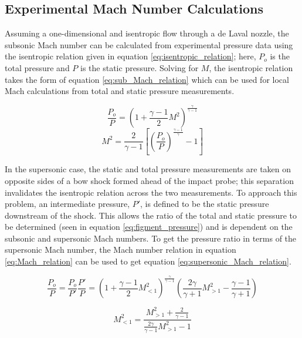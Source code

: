 \documentclass[runningheads]{llncs}
\begin{document}
\subsection{Experimental Mach Number Calculations}

Assuming a one-dimensional and isentropic flow through a de Laval nozzle, the subsonic Mach number can be calculated from experimental pressure data using the isentropic relation given in equation \ref{eq:isentropic_relation}; here, $P_o$ is the total pressure and $P$ is the static pressure. Solving for $M$, the isentropic relation takes the form of equation \ref{eq:sub_Mach_relation} which can be used for local Mach calculations from total and static pressure measurements.

\begin{multicols}{2}
\begin{equation}
    \frac{P_o}{P} = \left(1 + \frac{\gamma - 1}{2}M^2\right)^\frac{\gamma}{\gamma - 1}
    \label{eq:isentropic_relation}
\end{equation}
\begin{equation}
    M^2 = \frac{2}{\gamma - 1}\left[\left(\frac{P_o}{P}\right)^\frac{\gamma - 1}{\gamma} - 1\right]
    \label{eq:sub_Mach_relation}
\end{equation}
\end{multicols}

\noindent
In the supersonic case, the static and total pressure measurements are taken on opposite sides of a bow shock formed ahead of the impact probe; this separation invalidates the isentropic relation across the two measurements. To approach this problem, an intermediate pressure, $P'$, is defined to be the static pressure downstream of the shock. This allows the ratio of the total and static pressure to be determined (seen in equation \ref{eq:figment_pressure}) and is dependent on the subsonic and supersonic Mach numbers. To get the pressure ratio in terms of the supersonic Mach number, the Mach number relation in equation \ref{eq:Mach_relation} can be used to get equation \ref{eq:supersonic_Mach_relation}.

\begin{equation}
    \frac{P_o}{P} = \frac{P_o}{P'}\frac{P'}{P} = \left(1+\frac{\gamma - 1}{2}M_{<1}^2\right)^{\frac{\gamma}{\gamma - 1}}\left(\frac{2\gamma}{\gamma + 1}M_{>1}^2 - \frac{\gamma - 1}{\gamma + 1}\right)
    \label{eq:figment_pressure}
\end{equation}

\begin{equation}
    M_{<1}^2=\frac{M_{>1}^2+\frac{2}{\gamma - 1}}{\frac{2\gamma}{\gamma - 1}M_{>1}^2 - 1}
    \label{eq:Mach_relation}
\end{equation}
\end{document}
